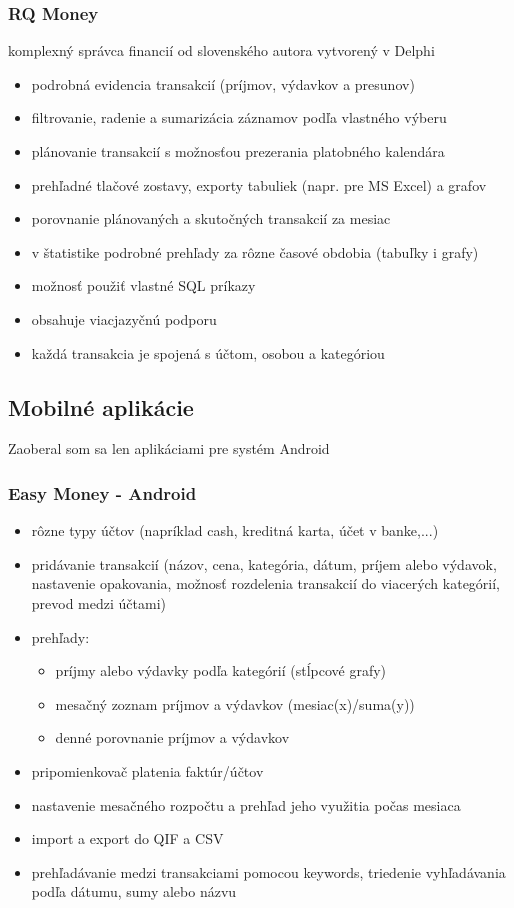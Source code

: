 \documentclass[12pt]{book}
\begin{document}
\subsubsection{RQ Money \cite{RQMoney}\ }
komplexný správca financií od slovenského autora vytvorený v Delphi
\begin{itemize}
\item{podrobná evidencia transakcií (príjmov, výdavkov a presunov)}
\item{filtrovanie, radenie a sumarizácia záznamov podľa vlastného výberu}
\item{plánovanie transakcií s možnosťou prezerania platobného kalendára}
\item{prehľadné tlačové zostavy, exporty tabuliek (napr. pre MS Excel) a grafov}
\item{porovnanie plánovaných a skutočných transakcií za mesiac}
\item{v štatistike podrobné prehľady za rôzne časové obdobia (tabuľky i grafy)}
\item{možnosť použiť vlastné SQL príkazy}
\item{obsahuje viacjazyčnú podporu}
\item{každá transakcia je spojená s účtom, osobou a kategóriou}
\end{itemize}

\subsection{Mobilné aplikácie}
Zaoberal som sa len aplikáciami pre systém Android
\subsubsection{Easy Money - Android \cite{EasyMoney}\ }
\begin{itemize}
\item{rôzne typy účtov (napríklad cash, kreditná karta, účet v banke,...)}
\item{pridávanie transakcií (názov, cena, kategória, dátum, príjem alebo výdavok, nastavenie opakovania, možnosť rozdelenia transakcií do viacerých kategórií, prevod medzi účtami)}
\item{prehľady:}
\begin{itemize}
\item{príjmy alebo výdavky podľa kategórií (stĺpcové grafy)}
\item{mesačný zoznam príjmov a výdavkov (mesiac(x)/suma(y))}
\item{denné porovnanie príjmov a výdavkov}
\end{itemize} 
\item{pripomienkovač platenia faktúr/účtov}
\item{nastavenie mesačného rozpočtu a prehľad jeho využitia počas mesiaca}
\item{import a export do QIF a CSV}
\item{prehľadávanie medzi transakciami pomocou keywords, triedenie vyhľadávania podľa dátumu, sumy alebo názvu}
\end{itemize}
\end{document}
